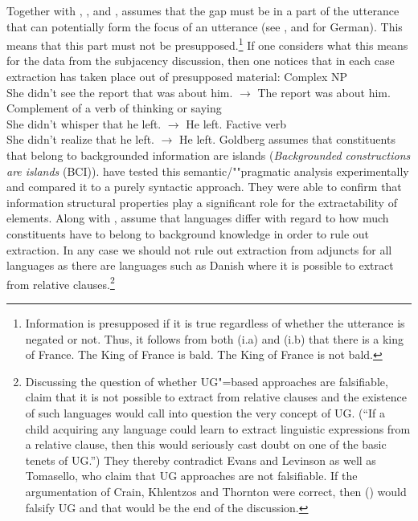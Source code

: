 \noindent
Together with \citet{Erteschik81a}, \citet{EL79a}, \citet{Takami88a}
and \citet{vanValin98a}, \citet[Section~7.2]{Goldberg2006a} assumes that the gap must be in a part of the utterance
that can potentially form the focus of an utterance (see ,  and
 for German). This means that this part must not be presupposed.\footnote{%
  Information is presupposed if it is true regardless of whether the utterance is negated or not.
  Thus, it follows from both (i.a) and (i.b) that there is a king of France.
  \eal
  \ex The King of France is bald.
  \ex The King of France is not bald.
  \zllast
}
If one considers what this means for the data from the subjacency discussion, then one notices that in each case extraction
has taken place out of presupposed material:
\eal
\ex Complex NP\\
She didn't see the report that was about him. $\to$ The report was about him.
\ex Complement of a verb of thinking or saying\\
She didn't whisper that he left. $\to$ He left.
\ex Factive verb\\
She didn't realize that he left. $\to$ He left.
\zl
Goldberg assumes that constituents that belong to backgrounded information are islands (\emph{Backgrounded constructions are islands} (BCI)).
\citet{AG2008a} have tested this semantic/""pragmatic analysis experimentally and compared it to a purely syntactic approach.
They were able to confirm that information structural properties play a significant role for the extractability
of elements. Along with \citet[Section~3.H]{Erteschik73a-u}, \citet[]{AG2008a} assume that languages differ with regard to how
much constituents have to belong to background knowledge in order to rule out extraction.
In any case we should not rule out extraction from adjuncts for all languages as there are languages such as Danish where it is possible to
extract from relative clauses.\footnote{%
Discussing the question of whether UG"=based approaches are falsifiable, \citet*[]{CKT2010a} claim that it is not possible to extract from relative clauses and the existence
of such languages would call into question the very concept of UG. (``If a child acquiring any language
could learn to extract linguistic expressions from a relative clause, then this would seriously
cast doubt on one of the basic tenets of UG.'') They thereby contradict Evans and Levinson as well as Tomasello, who claim that UG approaches are
not falsifiable. If the argumentation of Crain, Khlentzos and Thornton were correct, then () would falsify
UG and that would be the end of the discussion.
}
